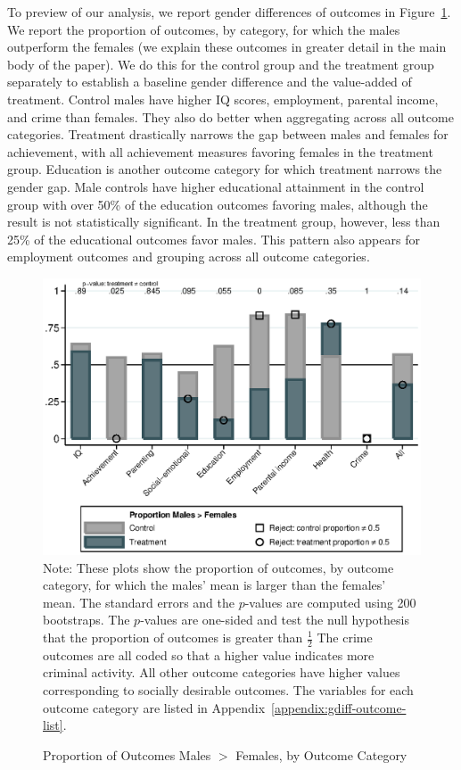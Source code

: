 To preview of our analysis, we report gender differences of outcomes in Figure~\ref{fig:proportion}. We report the proportion of outcomes, by category, for which the males outperform the females (we explain these outcomes in greater detail in the main body of the paper). We do this for the control group and the treatment group separately to establish a baseline gender difference and the value-added of treatment. Control males have higher IQ scores, employment, parental income, and crime than females. They also do better when aggregating across all outcome categories. Treatment drastically narrows the gap between males and females for achievement, with all achievement measures favoring females in the treatment group. Education is another outcome category for which treatment narrows the gender gap. Male controls have higher educational attainment in the control group with over 50\% of the education outcomes favoring males, although the result is not statistically significant. In the treatment group, however, less than 25\% of the educational outcomes favor males. This pattern also appears for employment outcomes and grouping across all outcome categories. 

\begin{figure}[!htbp]
\centering
\caption{Proportion of Outcomes Males $>$ Females, by Outcome Category}
\label{fig:proportion}
	\includegraphics[width=\textwidth]{output/gendergaps-treat-vs-fullcontrol}
\footnotesize \justify
Note: These plots show the proportion of outcomes, by outcome category, for which the males' mean is larger than the females' mean. The standard errors and the $p$-values are computed using 200 bootstraps. The $p$-values are one-sided and test the null hypothesis that the proportion of outcomes is greater than $\frac{1}{2}$ The crime outcomes are all coded so that a higher value indicates more criminal activity. All other outcome categories have higher values corresponding to socially desirable outcomes. The variables for each outcome category are listed in Appendix~\ref{appendix:gdiff-outcome-list}.
\end{figure}

